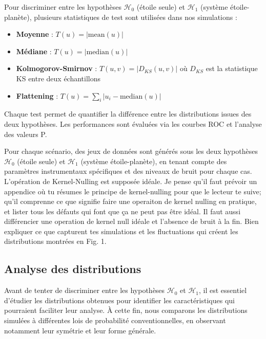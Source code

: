 \documentclass{article}
\newcommand{\dm}[1]{{\color{mulberry} #1}}
\begin{document}
Pour discriminer entre les hypothèses $\mathcal{H}_0$ (étoile seule) et $\mathcal{H}_1$ (système étoile-planète), plusieurs statistiques de test sont utilisées dans nos simulations :

\begin{itemize}
    \item \textbf{Moyenne} : $T(u) = |\mathrm{mean}(u)|$
    \item \textbf{Médiane} : $T(u) = |\mathrm{median}(u)|$
    \item \textbf{Kolmogorov-Smirnov} : $T(u, v) = |D_{KS}(u, v)|$ où $D_{KS}$ est la statistique KS entre deux échantillons
    \item \textbf{Flattening} : $T(u) = \sum_i |u_i - \mathrm{median}(u)|$
\end{itemize}

Chaque test permet de quantifier la différence entre les distributions issues des deux hypothèses. Les performances sont évaluées via les courbes ROC et l'analyse des valeurs P.

Pour chaque scénario, des jeux de données sont générés sous les deux hypothèses $\mathcal{H}_0$ (étoile seule) et $\mathcal{H}_1$ (système étoile-planète), en tenant compte des paramètres instrumentaux spécifiques et des niveaux de bruit pour chaque cas. L'opération de Kernel-Nulling est supposée idéale.\dm{Je pense qu'il faut prévoir un appendice où tu résumes le principe de kernel-nulling pour que le lecteur te suive; qu'il comprenne ce que signifie faire une operaiton de kernel nulling en pratique, et lister tous les défauts qui font que ça ne peut pas être idéal. Il faut aussi différencier une operation de kernel null idéale et l'absence de bruit à la fin. Bien expliquer ce que capturent tes simulations et les fluctuations qui créent les distributions montrées en Fig. 1.}

\subsection{Analyse des distributions}  \label{sec:distribution_analysis}

Avant de tenter de discriminer entre les hypothèses $\mathcal{H}_0$ et $\mathcal{H}_1$, il est essentiel d'étudier les distributions obtenues pour identifier les caractéristiques qui pourraient faciliter leur analyse. À cette fin, nous comparons les distributions simulées à différentes lois de probabilité conventionnelles, en observant notamment leur symétrie et leur forme générale.
\end{document}
